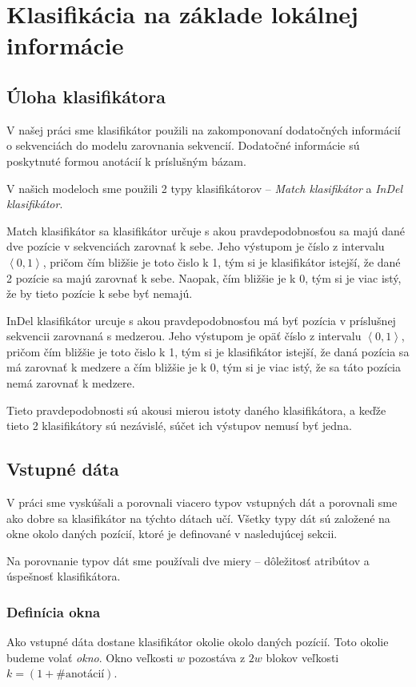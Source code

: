 \chapter[Klasifikácia]{Klasifikácia na základe lokálnej informácie}

\section{Úloha klasifikátora}

V našej práci sme klasifikátor použili na zakomponovaní dodatočných informácií o sekvenciách do modelu zarovnania sekvencií. Dodatočné informácie sú poskytnuté formou anotácií k príslušným bázam.

V našich modeloch sme použili 2 typy klasifikátorov -- \textit{Match klasifikátor} a \textit{InDel klasifikátor}.

Match klasifikátor sa klasifikátor určuje s akou pravdepodobnosťou sa majú dané dve pozície v sekvenciách zarovnať k sebe. Jeho výstupom je číslo z intervalu $\left<0,1\right>$, pričom čím bližšie je toto čislo k 1, tým si je klasifikátor istejší, že dané 2 pozície sa majú zarovnať k sebe. Naopak, čím bližšie je k 0, tým si je viac istý, že by tieto pozície k sebe byť nemajú.

InDel klasifikátor urcuje s akou pravdepodobnosťou má byť pozícia v príslušnej sekvencii zarovnaná s medzerou. Jeho výstupom je opäť  číslo z intervalu $\left<0,1\right>$, pričom čím bližšie je toto čislo k 1, tým si je klasifikátor istejší, že daná pozícia sa má zarovnať k medzere a čím bližšie je k 0, tým si je viac istý, že sa táto pozícia nemá zarovnať k medzere.

Tieto pravdepodobnosti sú akousi mierou istoty daného klasifikátora, a keďže tieto 2 klasifikátory sú nezávislé, súčet ich výstupov nemusí byť jedna.

\section{Vstupné dáta}

V práci sme vyskúšali a porovnali viacero typov vstupných dát a porovnali sme ako dobre sa klasifikátor na týchto dátach učí. Všetky typy dát sú založené na okne okolo daných pozícií, ktoré je definované v nasledujúcej sekcii.

Na porovnanie typov dát sme používali dve miery -- dôležitosť atribútov a úspešnosť klasifikátora.

\subsection{Definícia okna}
\label{subsec:window}
Ako vstupné dáta dostane klasifikátor okolie okolo daných pozícií. Toto okolie budeme volať \textit{okno}. Okno veľkosti $w$ pozostáva z $2w$ blokov veľkosti $k = (1+\#\text{anotácií})$.


